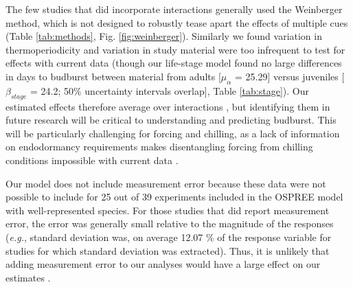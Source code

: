 \documentclass{article}
\begin{document}
The few studies that did incorporate interactions generally used the Weinberger method, which is not designed to robustly tease apart the effects of multiple cues (Table \ref{tab:methods}, Fig. \ref{fig:weinberger}).  Similarly we found variation in thermoperiodicity and variation in study material were too infrequent to test for effects with current data (though our life-stage model found no large differences in days to budburst between material from adults [$\mu_{\alpha}$ = 25.29] versus juveniles [$\beta_{stage}$ = 24.2; 50\% uncertainty intervals overlap], Table \ref{tab:stage}). Our estimated effects therefore average over interactions \emph{\citep{gelman2006}}, but identifying them in future research will be critical to understanding and predicting budburst. This will be particularly challenging for forcing and chilling, as a lack of information on endodormancy requirements makes  disentangling forcing from chilling conditions impossible with current data \emph{\citep{chuine2016}}.

\par Our model does not include measurement error because these data were not possible to include for 25 out of 39 experiments included in the OSPREE model with well-represented species. For those studies that did report measurement error, the error was generally small relative to the magnitude of the responses (\emph{e.g.}, standard deviation was, on average 12.07 \% of the  response variable for studies for which standard deviation was extracted). Thus, it is unlikely that adding measurement error to our analyses would have a large effect on our estimates \emph{\citep{rstan2019}}. \\


\pagebreak

\newpage
\end{document}
